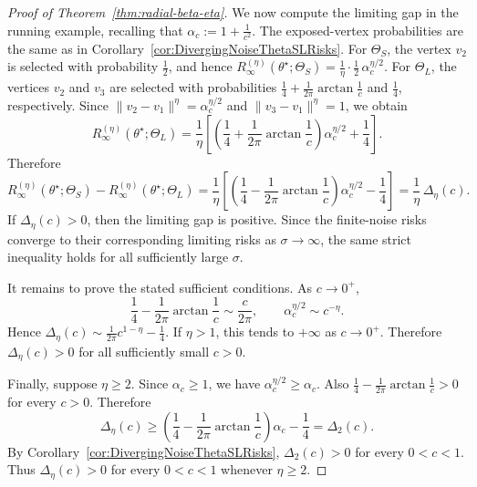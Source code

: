 \documentclass[11pt]{article}
\theoremstyle{plain}
\theoremstyle{definition}
\begin{document}
\begin{proof}[Proof of Theorem~\ref{thm:radial-beta-eta}]
We now compute the limiting gap in the running example, recalling that $\alpha_c := 1 + \frac{1}{c^2}$. The exposed-vertex probabilities are the same as in
Corollary~\ref{cor:DivergingNoiseThetaSLRisks}. For $\Theta_S$, the vertex
$v_2$ is selected with probability $\frac12$, and hence $R_{\infty}^{(\eta)}(\theta^\star;\Theta_S)
    =
    \frac1\eta\cdot \frac12\,\alpha_c^{\eta/2}$. For $\Theta_L$, the vertices $v_2$ and $v_3$ are selected with
probabilities $\frac14+\frac{1}{2\pi}\arctan\frac1c$ and $\frac14$,
respectively. Since
$\|v_2-v_1\|^\eta=\alpha_c^{\eta/2}$ and $\|v_3-v_1\|^\eta=1$, we obtain
\[
    R_{\infty}^{(\eta)}(\theta^\star;\Theta_L)
    =
    \frac1\eta
    \left[
    \left(
        \frac14+\frac{1}{2\pi}\arctan\frac1c
    \right)
    \alpha_c^{\eta/2}
    +
    \frac14
    \right].
\]
Therefore
\[
    R_{\infty}^{(\eta)}(\theta^\star;\Theta_S)
    -
    R_{\infty}^{(\eta)}(\theta^\star;\Theta_L)
    =
    \frac1\eta
    \left[
    \left(
        \frac14-\frac{1}{2\pi}\arctan\frac1c
    \right)
    \alpha_c^{\eta/2}
    -
    \frac14
    \right]
    =
    \frac1\eta\,\Delta_\eta(c).
\]
If $\Delta_\eta(c)>0$, then the limiting gap is positive. Since the
finite-noise risks converge to their corresponding limiting risks as
$\sigma\to\infty$, the same strict inequality holds for all sufficiently
large $\sigma$.

It remains to prove the stated sufficient conditions. As $c\to0^+$,
\[
    \frac14-\frac{1}{2\pi}\arctan\frac1c
    \sim
    \frac{c}{2\pi},
    \qquad
    \alpha_c^{\eta/2}
    \sim
    c^{-\eta}.
\]
Hence $\Delta_\eta(c) \sim \frac{1}{2\pi}c^{1-\eta}-\frac14$. If $\eta>1$, this tends to $+\infty$ as $c\to0^+$. Therefore
$\Delta_\eta(c)>0$ for all sufficiently small $c>0$.

Finally, suppose $\eta\ge2$. Since $\alpha_c\ge1$, we have
$\alpha_c^{\eta/2}\ge\alpha_c$. Also $\frac14-\frac{1}{2\pi}\arctan\frac1c > 0$ for every $c>0$. Therefore
\[
    \Delta_\eta(c)
    \ge
    \left(
        \frac14-\frac{1}{2\pi}\arctan\frac1c
    \right)
    \alpha_c
    -
    \frac14
    =
    \Delta_2(c).
\]
By Corollary~\ref{cor:DivergingNoiseThetaSLRisks}, $\Delta_2(c)>0$ for every
$0<c<1$. Thus $\Delta_\eta(c)>0$ for every $0<c<1$ whenever
$\eta\ge2$.
\end{proof}
\end{document}
